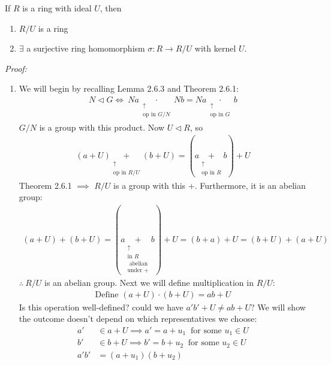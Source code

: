 \begin{lemma}
If $R$ is a ring with ideal $U$, then
\begin{enumerate}[label=\roman*)]
    \item $R/U$ is a ring
    \item $\exists$ a surjective ring homomorphism $\sigma : R \rightarrow R/U$ with kernel $U$.
\end{enumerate}
\textit{Proof:}
\begin{enumerate}[label=\roman*)]
    \item We will begin by recalling Lemma 2.6.3 and Theorem 2.6.1:
    \begin{align}
        N \triangleleft G \iff \ Na \underset{\substack{\uparrow \\ \text{op in }G/N}}{\cdot} Nb = Na\underset{\substack{\uparrow \\ \text{op in }G}}{\cdot} b \nonumber
    \end{align}
    $G/N$ is a group with this product. Now $U \triangleleft R$, so
    \begin{align}
        (a+U)\underset{\substack{\uparrow \\ \text{op in }R/U}}{+} (b+U) = (a\underset{\substack{\uparrow \\ \text{op in }R}}{+}b)+U \nonumber
    \end{align}
    Theorem 2.6.1 $\implies$ $R/U$ is a group with this $+$. Furthermore, it is an abelian group:
    \begin{align}
        (a+U)+(b+U)= (a\underset{\substack{\uparrow \\ \text{in }R \\ \text{ abelian} \\ \text{under +}}}{+}b)+U = (b+a) + U = (b+U) + (a+U)\nonumber
    \end{align}
    $\therefore \ R/U$ is an abelian group. Next we will define multiplication in $R/U$:
    \begin{align}
        \text{Define }(a+U)\cdot (b+U) = ab + U \nonumber
    \end{align}
    Is this operation well-defined? could we have $a'b'+U \neq ab+U$? We will show the outcome
    doesn't depend on which representatives we choose:
    \begin{align}
        a' &\in a+U \implies a'=a+u_1 \ \text{ for some }u_1\in U \nonumber \\
        b' &\in b+U \implies b'=b+u_2 \ \text{ for some }u_2 \in U \nonumber \\
        a'b'&= (a+u_1)(b+u_2) \nonumber \\

\end{align}
\end{enumerate}
\end{lemma}
